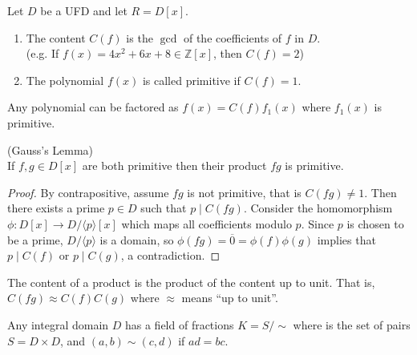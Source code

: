 \documentclass{article}
\newenvironment{definition}[1][Definition.]{
  \begin{trivlist} \item[\hskip \labelsep {\bfseries #1}]
}{\end{trivlist}}
\newenvironment{note}[1][Note.]{
  \begin{trivlist} \item[\hskip \labelsep {\bfseries #1}]
}{\end{trivlist}}
\newenvironment{theorem}[1][Theorem.]{
  \begin{trivlist} \item[\hskip \labelsep {\bfseries #1}]
}{\end{trivlist}}
\newcommand{\ang}[1]{\langle #1 \rangle}
\newcommand{\fn}[3]{#1 \colon #2 \rightarrow #3}
\begin{document}
\begin{definition}[Definitions.]
  Let $D$ be a UFD and let $R = D[x]$.
  \begin{enumerate}
    \item The content $C(f)$ is the $\gcd$ of the coefficients of $f$ in $D$.
    \\
    (e.g. If $f(x) = 4x^2 + 6x + 8 \in \mathbb Z[x]$, then $C(f) = 2$)
    \item The polynomial $f(x)$ is called primitive if $C(f) = 1$.
  \end{enumerate}
\end{definition}
\begin{note}
  Any polynomial can be factored as $f(x) = C(f)f_1(x)$ where $f_1(x)$ is
  primitive.
\end{note}
\begin{theorem}[Lemma.] (Gauss's Lemma) \\
  If $f, g \in D[x]$ are both primitive then their product $fg$ is primitive.
\end{theorem}
\begin{proof}
  By contrapositive, assume $fg$ is not primitive, that is $C(fg) \neq 1$.
  Then there exists a prime $p \in D$ such that $p \mid C(fg)$.
  Consider the homomorphism $\fn{\phi}{D[x]}{D/\ang{p}[x]}$ which maps all
  coefficients modulo $p$. Since $p$ is chosen to be a prime, $D/\ang p$ is a
  domain, so $\phi(fg) = \overline 0 = \phi(f)\phi(g)$ implies that
  $p \mid C(f)$ or $p \mid C(g)$, a contradiction.
\end{proof}
\begin{theorem}[Corollary.]
  The content of a product is the product of the content up to unit. That is,
  $C(fg) \approx C(f) C(g)$ where $\approx$ means
  ``up to unit''.
\end{theorem}
\begin{note}[Fact.]
  Any integral domain $D$ has a field of fractions $K = S/{\sim}$ where
  is the set of pairs $S = D \times D$, and $(a, b) \sim (c, d)$ if $ad = bc$.
\end{note}
\end{document}
